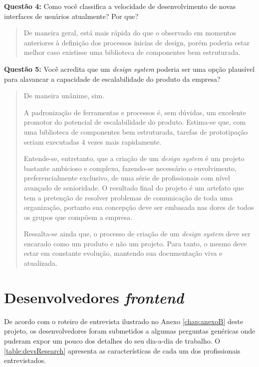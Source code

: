 \textbf{Questão 4:} Como você classifica a velocidade de desenvolvimento de novas interfaces de usuários atualmente? Por que?

\begin{quote}
    De maneira geral, está mais rápida do que o observado em momentos anteriores à definição dos processos inicias de design, porém poderia estar melhor caso existisse uma biblioteca de componentes bem estruturada.
\end{quote}

\textbf{Questão 5:} Você acredita que um \textit{design system} poderia ser uma opção plausível para alavancar a capacidade de escalabilidade do produto da empresa?

\begin{quote}
    De maneira unânime, sim.

    A padronização de ferramentas e processos é, sem dúvidas, um excelente promotor do potencial de escalabilidade do produto. Estima-se que, com uma biblioteca de componentes bem estruturada, tarefas de prototipação seriam executadas 4 vezes mais rapidamente.
    
    Entende-se, entretanto, que a criação de um \textit{design system} é um projeto bastante ambicioso e complexo, fazendo-se necessário o envolvimento, preferencialmente exclusivo, de uma série de profissionais com nível avançado de senioridade. O resultado final do projeto é um artefato que tem a pretenção de resolver problemas de comunicação de toda uma organização, portanto sua concepção deve ser embasada nas dores de todos os grupos que compõem a empresa.
    
    Ressalta-se ainda que, o processo de criação de um \textit{design system} deve ser encarado como um produto e não um projeto. Para tanto, o mesmo deve estar em constante evolução, mantendo sua documentação viva e atualizada.
\end{quote}

\section{Desenvolvedores \textit{frontend}}
\label{sec:entrevistasDevs}

De acordo com o roteiro de entrevista ilustrado no Anexo \ref{chap:anexoB} deste projeto, os desenvolvedores foram submetidos a algumas perguntas genéricas onde puderam expor um pouco dos detalhes do seu dia-a-dia de trabalho. O \autoref{table:devsResearch} apresenta as características de cada um dos profissionais entrevistados.

